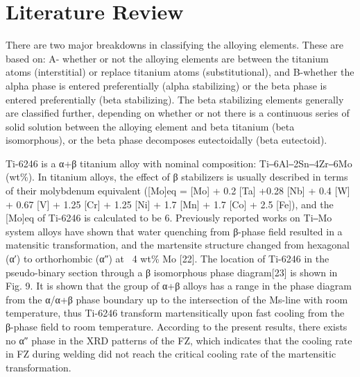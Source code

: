 \chapter{Literature Review}
\iffalse
Titanium can exist in two allotropic forms: alpha (a hexagonal close-packed crystal structure) and beta (a body-cen- tered cubic structure) (Ref 7.1–7.4). In pure tita- nium, the alpha (a) phase is stable up to 880\degC (1620\degF), at which point it transforms to the beta (b) phase; the beta phase is stable from 880\degC (1620 °F) to the melting point. At room temperature, pure titanium consists of the alpha phase. However, the alloys can contain alpha, mixtures of alpha and beta, or beta phases, de- pending on the alloy content and conditions. Thus, the alloys are classified into these structural types: alpha ($\alpha$), alpha-beta ($\alpha$-$\beta$), and beta ($\beta$).
\fi

There are two major breakdowns in classifying the alloying elements. These are based on: A- whether or not the alloying elements are between the titanium atoms (interstitial) or replace titanium atoms (substitutional), and B-whether the alpha phase is entered preferentially (alpha stabilizing) or the beta phase is entered preferentially (beta stabilizing). The beta stabilizing elements generally are classified further, depending on whether or not there is a continuous series of solid solution between the alloying element and beta titanium (beta isomorphous), or the beta phase decomposes eutectoidally (beta eutectoid).


Ti-6246 is a α+β titanium alloy with nominal composition: Ti‒6Al‒2Sn‒4Zr‒6Mo (wt\%). In titanium alloys, the effect of β stabilizers is usually described in terms of their molybdenum equivalent ([Mo]eq = [Mo] + 0.2 [Ta] +0.28 [Nb] + 0.4 [W] + 0.67 [V] + 1.25 [Cr] + 1.25 [Ni] + 1.7 [Mn] + 1.7 [Co] + 2.5 [Fe]), and the [Mo]eq of Ti-6246 is calculated to be 6. Previously reported works on Ti‒Mo system alloys have shown that water quenching from β-phase field resulted in a matensitic transformation, and the martensite structure changed from hexagonal (α′) to orthorhombic (α″) at ~4 wt\% Mo [22]. The location of Ti-6246 in the pseudo-binary section through
a β isomorphous phase diagram[23] is shown in Fig. 9. It is shown that the group of α+β alloys has a
range in the phase diagram from the α/α+β phase boundary up to the intersection of the Ms-line
with room temperature, thus Ti-6246 transform martensitically upon fast cooling from the β-phase
field to room temperature. According to the present results, there exists no α″ phase in the XRD
patterns of the FZ, which indicates that the cooling rate in FZ during welding did not reach the
critical cooling rate of the martensitic transformation.

